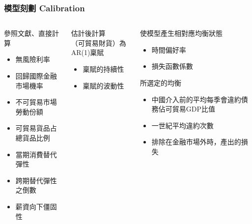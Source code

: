\documentclass[mathserif]{beamer}
\begin{document}
    \begin{frame}
        \frametitle{模型刻劃 Calibration}
        \begin{columns}
            \small
            \begin{column}[t]{0.33\textwidth}
                參照文獻、直接計算
                \begin{itemize}
                \item 無風險利率
                \item 回歸國際金融市場機率
                \item 不可貿易市場勞動份額
                \item 可貿易貨品占總貨品比例
                \item 當期消費替代彈性
                \item 跨期替代彈性之倒數
                \item 薪資向下僵固性
                \end{itemize}
            \end{column}%
            \pause
            \begin{column}[t]{0.33\textwidth}
                估計後計算\\
                （可貿易財貨）為 AR(1)稟賦
                \begin{itemize}
                    \item 稟賦的持續性
                    \item 稟賦的波動性
                \end{itemize}
            \end{column}%
            \pause
            \begin{column}[t]{0.33\textwidth}
                使模型產生相對應均衡狀態
                \begin{itemize}
                    \item 時間偏好率
                    \item 損失函數係數
                \end{itemize}
                \vfill
                所選定的均衡
                \begin{itemize}
                    \item 中國介入前的平均每季會違約債務佔可貿易GDP比值
                    \item 一世紀平均違約次數
                    \item 排除在金融市場外時，產出的損失
                \end{itemize}
            \end{column}
        \end{columns}
    \end{frame}
\end{document}
